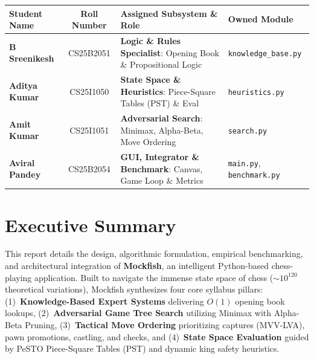 \documentclass[11pt,a4paper]{article}
\begin{document}
\begin{titlepage}
    \begin{table}[h!]
    \centering
    \small
    \renewcommand{\arraystretch}{1.35}
    \begin{tabularx}{0.96\textwidth}{l c Y l}
        \toprule
        \textbf{Student Name} & \textbf{Roll Number} & \textbf{Assigned Subsystem \& Role} & \textbf{Owned Module} \\
        \midrule
        \textbf{B Sreenikesh} & CS25B2051 & \textbf{Logic \& Rules Specialist}: Opening Book \& Propositional Logic & \texttt{knowledge\_base.py} \\
        \textbf{Aditya Kumar} & CS25I1050 & \textbf{State Space \& Heuristics}: Piece-Square Tables (PST) \& Eval & \texttt{heuristics.py} \\
        \textbf{Amit Kumar}   & CS25I1051 & \textbf{Adversarial Search}: Minimax, Alpha-Beta, Move Ordering & \texttt{search.py} \\
        \textbf{Aviral Pandey}& CS25B2054 & \textbf{GUI, Integrator \& Benchmark}: Canvas, Game Loop \& Metrics & \texttt{main.py}, \texttt{benchmark.py} \\
        \bottomrule
    \end{tabularx}
    \end{table}
    
    \vfill
\end{titlepage}

\setcounter{page}{2}

\section*{Executive Summary}

This report details the design, algorithmic formulation, empirical benchmarking, and architectural integration of \textbf{Mockfish}, an intelligent Python-based chess-playing application. Built to navigate the immense state space of chess ($\sim 10^{120}$ theoretical variations), Mockfish synthesizes four core syllabus pillars: (1)~\textbf{Knowledge-Based Expert Systems} delivering $O(1)$ opening book lookups, (2)~\textbf{Adversarial Game Tree Search} utilizing Minimax with Alpha-Beta Pruning, (3)~\textbf{Tactical Move Ordering} prioritizing captures (MVV-LVA), pawn promotions, castling, and checks, and (4)~\textbf{State Space Evaluation} guided by PeSTO Piece-Square Tables (PST) and dynamic king safety heuristics.
\end{document}
